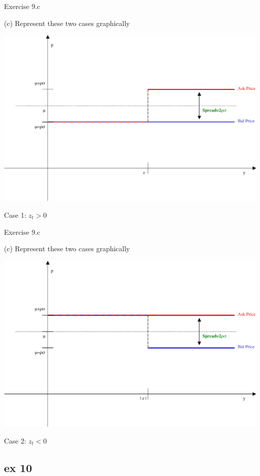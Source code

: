 \documentclass[english,10pt]{beamer}
\begin{document}
\begin{frame}{Exercise 9.c}
	\begin{exampleblock}{}
		(c) Represent these two cases graphically
	\end{exampleblock}
	\centering
	\includegraphics[scale=0.2]{pics/ex9c_1}
	
	Case 1: $z_t > 0$
\end{frame}


\begin{frame}{Exercise 9.c}
	\begin{exampleblock}{}
		(c) Represent these two cases graphically
	\end{exampleblock}
	\centering
	\includegraphics[scale=0.2]{pics/ex9c_2}
	
	Case 2: $z_t < 0$
\end{frame}




\subsection{ex 10}
\end{document}
